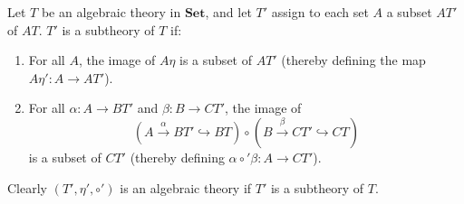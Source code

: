 Let $T$ be an algebraic theory in $\mathbf{Set}$, and let $T'$ assign to each set $A$ a subset $AT'$ of $AT$. $T'$ is a subtheory of $T$ if:

\begin{enumerate}
\item For all $A$, the image of $A\eta$ is a subset of $AT'$ (thereby defining the map $A\eta': A \longrightarrow AT'$).
\item For all $\alpha: A \longrightarrow BT'$ and $\beta: B \longrightarrow CT'$, the image of
$$\left( A \xrightarrow{\alpha} BT' \hookrightarrow BT \right) \circ \left( B \xrightarrow{\beta} CT' \hookrightarrow CT \right)$$
is a subset of $CT'$ (thereby defining $\alpha \circ' \beta: A \longrightarrow CT'$).
\end{enumerate}

Clearly $(T', \eta', \circ')$ is an algebraic theory if $T'$ is a subtheory of $T$.
